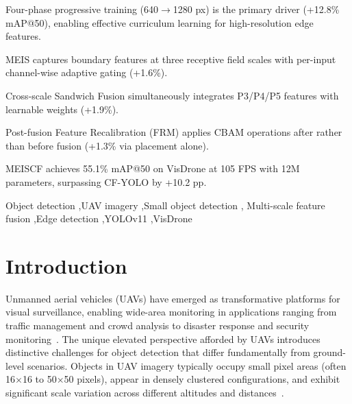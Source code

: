 \documentclass[preprint,12pt]{elsarticle}
\begin{document}
\begin{frontmatter}
\begin{highlights}
\item Four-phase progressive training (640$\to$1280 px) is the primary driver
      (+12.8\% mAP@50), enabling effective curriculum learning for high-resolution
      edge features.
\item MEIS captures boundary features at three receptive field scales with
      per-input channel-wise adaptive gating (+1.6\%).
\item Cross-scale Sandwich Fusion simultaneously integrates P3/P4/P5 features
      with learnable weights (+1.9\%).
\item Post-fusion Feature Recalibration (FRM) applies CBAM operations after
      rather than before fusion (+1.3\% via placement alone).
\item MEISCF achieves 55.1\% mAP@50 on VisDrone at 105 FPS with 12M parameters,
      surpassing CF-YOLO by +10.2 pp.
\end{highlights}

\begin{keyword}
Object detection \sep UAV imagery \sep Small object detection \sep
Multi-scale feature fusion \sep Edge detection \sep YOLOv11 \sep VisDrone
\end{keyword}

\end{frontmatter}


\section{Introduction}
\label{sec:intro}

Unmanned aerial vehicles (UAVs) have emerged as transformative platforms for
visual surveillance, enabling wide-area monitoring in applications ranging from
traffic management and crowd analysis to disaster response and security
monitoring~\cite{visdrone2019}. The unique elevated perspective afforded by UAVs
introduces distinctive challenges for object detection that differ fundamentally
from ground-level scenarios. Objects in UAV imagery typically occupy small pixel
areas (often 16$\times$16 to 50$\times$50 pixels), appear in densely clustered
configurations, and exhibit significant scale variation across different altitudes
and distances~\cite{uav-survey}.
\end{document}
